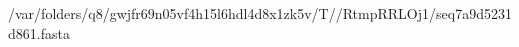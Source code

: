 \documentclass[10pt]{article}
\begin{document}
\begin{texshade}{/var/folders/q8/gwjfr69n05vf4h15l6hdl4d8x1zk5v/T//RtmpRRLOj1/seq7a9d5231d861.fasta}
\hidelogoscale
{}
\showlegend
\end{texshade}
\end{document}
